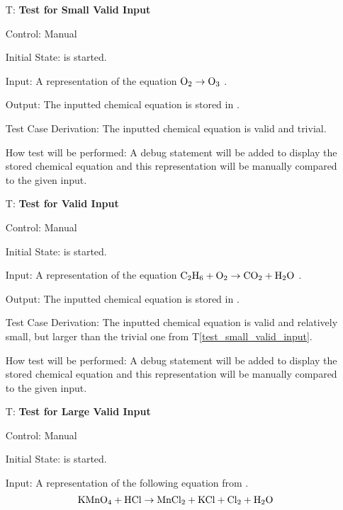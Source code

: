 \documentclass[12pt, titlepage]{article}
\newcounter{testnum} %
\newcommand{\testref}[1]{T\ref{#1}}
\begin{document}
\begin{enumerate}

  \item[T\refstepcounter{testnum}\thetestnum \label{test_small_valid_input}:]
    \textbf{Test for Small Valid Input}

    Control: Manual

    Initial State: \progname{} is started.

    Input: A representation of the equation $\ce{O2} \rightarrow \ce{O3}$
    \cite{fahey_twenty_2011}.

    Output: The inputted chemical equation is stored in \progname{}.

    Test Case Derivation: The inputted chemical equation is
    valid and trivial.

    How test will be performed: A debug statement will be added to display the
    stored chemical equation and this representation will be manually compared to
    the given input.

  \item[T\refstepcounter{testnum}\thetestnum \label{test_valid_input}:]
    \textbf{Test for Valid Input}

    Control: Manual

    Initial State: \progname{} is started.

    Input: A representation of the equation
    $\ce{C2H6} + \ce{O2} \rightarrow \ce{CO2} + \ce{H2O}$
    \cite{hamid_balancing_2019}.

    Output: The inputted chemical equation is stored in \progname{}.

    Test Case Derivation: The inputted chemical equation is valid and
    relatively small, but larger than the trivial one from
    \testref{test_small_valid_input}.

    How test will be performed: A debug statement will be added to display the
    stored chemical equation and this representation will be manually compared to
    the given input.

  \item[T\refstepcounter{testnum}\thetestnum \label{test_large_valid_input}:]
    \textbf{Test for Large Valid Input}

    Control: Manual

    Initial State: \progname{} is started.

    Input: A representation of the following equation from
    \cite{taylor_balancing_2021}.
    $$\ce{KMnO4} + \ce{HCl} \rightarrow \ce{MnCl2} + \ce{KCl} + \ce{Cl2} +
      \ce{H2O}$$


\end{enumerate}
\end{document}
